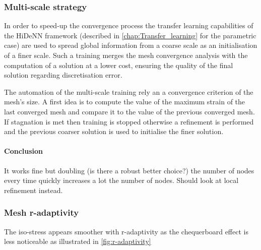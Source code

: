 \subsubsection{Multi-scale strategy}

In order to speed-up the convergence process the transfer learning capabilities of the HiDeNN framework (described in \cref{chap:Transfer_learning} for the parametric case) are used to spread global information from a coarse scale as an initialisation of a finer scale. Such a training merges the mesh convergence analysis with the computation of a solution at a lower cost, ensuring the quality of the final solution regarding discretisation error. 


The automation of the multi-scale training rely an a convergence criterion of the mesh's size. A first idea is to compute the value of the maximum strain of the last converged mesh and compare it to the value of the previous converged mesh. If stagnation is met then training is stopped otherwise a refinement is performed and the previous coarser solution is used to initialise the finer solution.

\paragraph{Conclusion} It works fine but doubling (is there a robust better choice?) the number of nodes every time quickly increases a lot the number of nodes. Should look at local refinement instead.

\subsubsection{Mesh r-adaptivity}


The iso-stress appears smoother with r-adaptivity as the chequerboard effect is less noticeable as illustrated in \cref{fig:r-adaptivity}

